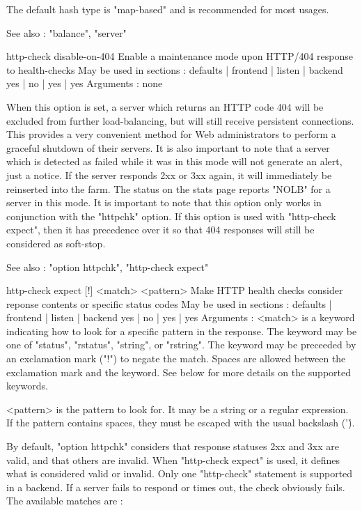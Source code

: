   The default hash type is "map-based" and is recommended for most usages.

  See also : "balance", "server"


http-check disable-on-404
  Enable a maintenance mode upon HTTP/404 response to health-checks
  May be used in sections :   defaults | frontend | listen | backend
                                 yes   |    no    |   yes  |   yes
  Arguments : none

  When this option is set, a server which returns an HTTP code 404 will be
  excluded from further load-balancing, but will still receive persistent
  connections. This provides a very convenient method for Web administrators
  to perform a graceful shutdown of their servers. It is also important to note
  that a server which is detected as failed while it was in this mode will not
  generate an alert, just a notice. If the server responds 2xx or 3xx again, it
  will immediately be reinserted into the farm. The status on the stats page
  reports "NOLB" for a server in this mode. It is important to note that this
  option only works in conjunction with the "httpchk" option. If this option
  is used with "http-check expect", then it has precedence over it so that 404
  responses will still be considered as soft-stop.

  See also : "option httpchk", "http-check expect"


http-check expect [!] <match> <pattern>
  Make HTTP health checks consider reponse contents or specific status codes
  May be used in sections :   defaults | frontend | listen | backend
                                 yes   |    no    |   yes  |   yes
  Arguments :
    <match>   is a keyword indicating how to look for a specific pattern in the
              response. The keyword may be one of "status", "rstatus",
              "string", or "rstring". The keyword may be preceeded by an
              exclamation mark ("!") to negate the match. Spaces are allowed
              between the exclamation mark and the keyword. See below for more
              details on the supported keywords.

    <pattern> is the pattern to look for. It may be a string or a regular
              expression. If the pattern contains spaces, they must be escaped
              with the usual backslash ('\').

  By default, "option httpchk" considers that response statuses 2xx and 3xx
  are valid, and that others are invalid. When "http-check expect" is used,
  it defines what is considered valid or invalid. Only one "http-check"
  statement is supported in a backend. If a server fails to respond or times
  out, the check obviously fails. The available matches are :

